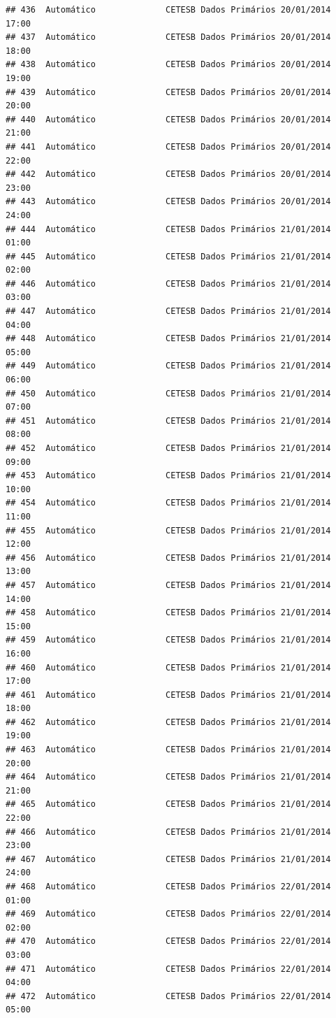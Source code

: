 \documentclass[]{book}
\begin{document}
\begin{verbatim}
## 436  Automático              CETESB Dados Primários 20/01/2014 17:00
## 437  Automático              CETESB Dados Primários 20/01/2014 18:00
## 438  Automático              CETESB Dados Primários 20/01/2014 19:00
## 439  Automático              CETESB Dados Primários 20/01/2014 20:00
## 440  Automático              CETESB Dados Primários 20/01/2014 21:00
## 441  Automático              CETESB Dados Primários 20/01/2014 22:00
## 442  Automático              CETESB Dados Primários 20/01/2014 23:00
## 443  Automático              CETESB Dados Primários 20/01/2014 24:00
## 444  Automático              CETESB Dados Primários 21/01/2014 01:00
## 445  Automático              CETESB Dados Primários 21/01/2014 02:00
## 446  Automático              CETESB Dados Primários 21/01/2014 03:00
## 447  Automático              CETESB Dados Primários 21/01/2014 04:00
## 448  Automático              CETESB Dados Primários 21/01/2014 05:00
## 449  Automático              CETESB Dados Primários 21/01/2014 06:00
## 450  Automático              CETESB Dados Primários 21/01/2014 07:00
## 451  Automático              CETESB Dados Primários 21/01/2014 08:00
## 452  Automático              CETESB Dados Primários 21/01/2014 09:00
## 453  Automático              CETESB Dados Primários 21/01/2014 10:00
## 454  Automático              CETESB Dados Primários 21/01/2014 11:00
## 455  Automático              CETESB Dados Primários 21/01/2014 12:00
## 456  Automático              CETESB Dados Primários 21/01/2014 13:00
## 457  Automático              CETESB Dados Primários 21/01/2014 14:00
## 458  Automático              CETESB Dados Primários 21/01/2014 15:00
## 459  Automático              CETESB Dados Primários 21/01/2014 16:00
## 460  Automático              CETESB Dados Primários 21/01/2014 17:00
## 461  Automático              CETESB Dados Primários 21/01/2014 18:00
## 462  Automático              CETESB Dados Primários 21/01/2014 19:00
## 463  Automático              CETESB Dados Primários 21/01/2014 20:00
## 464  Automático              CETESB Dados Primários 21/01/2014 21:00
## 465  Automático              CETESB Dados Primários 21/01/2014 22:00
## 466  Automático              CETESB Dados Primários 21/01/2014 23:00
## 467  Automático              CETESB Dados Primários 21/01/2014 24:00
## 468  Automático              CETESB Dados Primários 22/01/2014 01:00
## 469  Automático              CETESB Dados Primários 22/01/2014 02:00
## 470  Automático              CETESB Dados Primários 22/01/2014 03:00
## 471  Automático              CETESB Dados Primários 22/01/2014 04:00
## 472  Automático              CETESB Dados Primários 22/01/2014 05:00

\end{verbatim}
\end{document}
